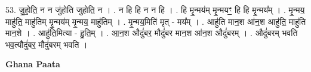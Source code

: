 \documentclass[17pt]{extarticle}
\begin{document}
53. जु॒हो॒ति॒ न न जु॑होति जुहोति॒ न । . न हि हि न न हि । . हि मृ॒न्मय॑म् मृ॒न्मयꣳ॒॒ हि हि मृ॒न्मय᳚म् । . मृ॒न्मय॒ माहु॑ति॒ माहु॑तिम् मृ॒न्मय॑म् मृ॒न्मय॒ माहु॑तिम् । . मृ॒न्मय॒मिति॑ मृत् - मय᳚म् । . आहु॑ति मान॒श आ॑न॒श आहु॑ति॒ माहु॑ति मान॒शे । . आहु॑ति॒मित्या - हु॒ति॒म् । . आ॒न॒श औदुं॑बर॒ मौदुं॑बर मान॒श आ॑न॒श औदुं॑बरम् । . औदुं॑बरम् भवति भव॒त्यौदुं॑बर॒ मौदुं॑बरम् भवति । \newline

\textbf{Ghana Paata } \newline
\end{document}
